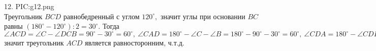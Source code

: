 12. {{PIC:g12.png}}\\
Треугольник $BCD$ равнобедренный с углом $120^\circ,$ значит углы при основании $BC$ равны $(180^\circ-120^\circ):2=30^\circ.$ Тогда $\angle ACD=\angle C-\angle DCB=90^\circ-30^\circ=60^\circ,\ \angle CAD=180^\circ-\angle C-\angle B=180^\circ-90^\circ-30^\circ=60^\circ,\ \angle CDA=180^\circ-\angle CDB=180^\circ-120^\circ=60^\circ,$
значит треугольник $ACD$ является равносторонним, ч.т.д.\\
